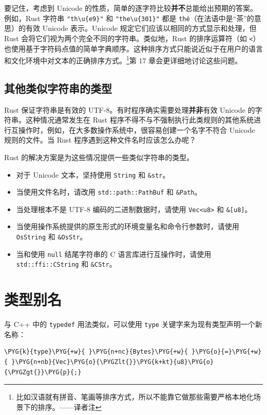 要记住，考虑到 Unicode 的性质，简单的逐字符比较\textbf{并不}总能给出预期的答案。例如，Rust 字符串 \texttt{"th\textbackslash{}u\{e9\}"} 和 \texttt{"the\textbackslash{}u\{301\}"} 都是 \texttt{thé}（在法语中是“茶”的意思）的有效 Unicode 表示。Unicode 规定它们应该以相同的方式显示和处理，但 Rust 会将它们视为两个完全不同的字符串。类似地，Rust 的排序运算符（如 \texttt{<}）也使用基于字符码点值的简单字典顺序。这种排序方式只能说近似于在用户的语言和文化环境中对文本的正确排序方式。\footnote{比如汉语就有拼音、笔画等排序方式，所以不能靠它做那些需要严格本地化场景下的排序。——译者注}第 17 章会更详细地讨论这些问题。

\subsection{其他类似字符串的类型}

Rust 保证字符串是有效的 UTF-8。有时程序确实需要处理\textbf{并非}有效 Unicode 的字符串。这种情况通常发生在 Rust 程序不得不与不强制执行此类规则的其他系统进行互操作时，例如，在大多数操作系统中，很容易创建一个名字不符合 Unicode 规则的文件。当 Rust 程序遇到这种文件名时应该怎么办呢？

Rust 的解决方案是为这些情况提供一些类似字符串的类型。

\begin{itemize}
\item 对于 Unicode 文本，坚持使用 \texttt{String} 和 \texttt{\&str}。
\item 当使用文件名时，请改用 \texttt{std::path::PathBuf} 和 \texttt{\&Path}。
\item 当处理根本不是 UTF-8 编码的二进制数据时，请使用 \texttt{Vec<u8>} 和 \texttt{\&[u8]}。
\item 当使用操作系统提供的原生形式的环境变量名和命令行参数时，请使用 \texttt{OsString} 和 \texttt{\&OsStr}。
\item 当和使用 \texttt{null} 结尾字符串的 C 语言库进行互操作时，请使用 \texttt{std::ffi::CString} 和 \texttt{\&CStr}。
\end{itemize}

\section{类型别名}

与 C++ 中的 \texttt{typedef} 用法类似，可以使用 \texttt{type} 关键字来为现有类型声明一个新名称：

\begin{Verbatim}[commandchars=\\\{\},breaklines=true,breakanywhere=true,fontsize=\codefont,xleftmargin=17bp]
\PYG{k}{type}\PYG{+w}{ }\PYG{n+nc}{Bytes}\PYG{+w}{ }\PYG{o}{=}\PYG{+w}{ }\PYG{n+nb}{Vec}\PYG{o}{\PYGZlt{}}\PYG{k+kt}{u8}\PYG{o}{\PYGZgt{}}\PYG{p}{;}
\end{Verbatim}


